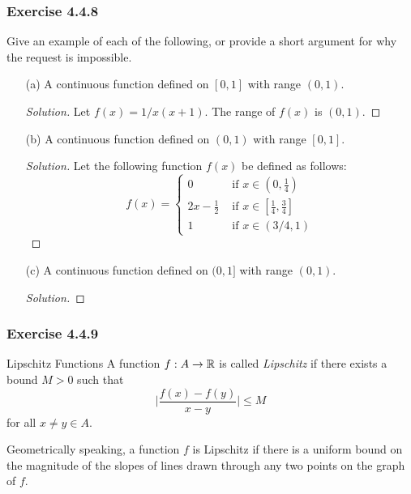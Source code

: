 \subsubsection{Exercise 4.4.8} Give an example of each of the following, or provide a short argument for why the request is impossible.
\begin{enumerate}
    \item[(a)] A continuous function defined on \( [0,1] \) with range \( (0,1) \).
        \begin{proof}[Solution]
        Let \( f(x) = 1 / x(x+1) \). The range of \( f(x) \) is \( (0,1) \).   
        \end{proof}
    \item[(b)] A continuous function defined on \( (0,1) \) with range \( [0,1] \).
        \begin{proof}[Solution]
        Let the following function \( f(x) \) be defined as follows:
        \[ f(x) = 
        \begin{cases}
            0 &\text{ if } x \in (0, \frac{ 1 }{ 4 } ) \\
            2x - \frac{ 1 }{ 2 } &\text{ if } x \in [ \frac{ 1 }{ 4 }, \frac{ 3 }{ 4 } ] \\
            1 &\text{ if } x \in (3/4, 1)
        \end{cases} \]
        \end{proof}
    \item[(c)] A continuous function defined on \( (0,1] \) with range \( (0,1) \).
        \begin{proof}[Solution]
        
        \end{proof}
\end{enumerate}


\subsubsection{Exercise 4.4.9}
\begin{definition}{Lipschitz Functions}{}
        A function \( f: A \to \mathbb{R}  \) is called \textit{Lipschitz} if there exists a bound \( M > 0  \) such that 
        \[ \Big| \frac{ f(x) - f(y) }{ x - y  }   \Big| \leq M  \]
        for all \( x \neq y \in A  \).
    \end{definition}
Geometrically speaking, a function \( f \) is Lipschitz if there is a uniform bound on the magnitude of the slopes of lines drawn through any two points on the graph of \( f \).

